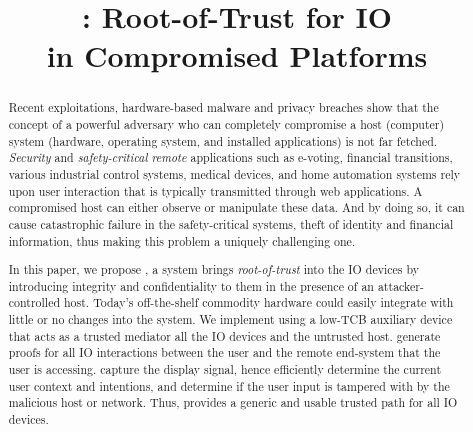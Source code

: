 \newif\ifccs
\ccsfalse

\ifccs

\else

\fi



\newif\ifdesperatetime

\graphicspath{{images/}}


\title{\name: Root-of-Trust for IO \\ in Compromised Platforms}

\ifccs
\else
\maketitle
\fi

\begin{abstract}
 
Recent exploitations, hardware-based malware and privacy breaches show that the concept of a powerful adversary who can completely compromise a host (computer) system (hardware, operating system, and installed applications) is not far fetched. \emph{Security} and \emph{safety-critical} \emph{remote} applications such as e-voting, financial transitions, various industrial control systems, medical devices, and home automation systems rely upon user interaction that is typically transmitted through web applications. A compromised host can either observe or manipulate these data. And by doing so, it can cause catastrophic failure in the safety-critical systems, theft of identity and financial information, thus making this problem a uniquely challenging one.

In this paper, we propose \name, a system brings \emph{root-of-trust} into the IO devices by introducing integrity and confidentiality to them in the presence of an attacker-controlled host. Today's off-the-shelf commodity hardware could easily integrate \name with little or no changes into the system. We implement \name using a low-TCB auxiliary device that acts as a trusted mediator all the IO devices and the untrusted host. \name generate proofs for all IO interactions between the user and the remote end-system that the user is accessing. \name capture the display signal, hence efficiently determine the current user context and intentions, and determine if the user input is tampered with by the malicious host or network. Thus, \name provides a generic and usable trusted path for all IO devices.

\end{abstract}


\ifccs
\maketitle
\else
\fi

